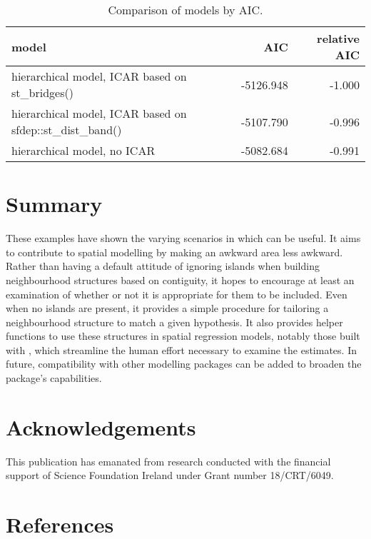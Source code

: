 \begin{table}

\caption{\label{tab:aic-latex}Comparison of models by AIC.}
\centering
\fontsize{8}{10}\selectfont
\begin{tabular}[t]{l|r|r}
\hline
\textbf{model} & \textbf{AIC} & \textbf{relative AIC}\\
\hline
hierarchical model, ICAR based on st\_bridges() & -5126.948 & -1.000\\
\hline
hierarchical model, ICAR based on sfdep::st\_dist\_band() & -5107.790 & -0.996\\
\hline
hierarchical model, no ICAR & -5082.684 & -0.991\\
\hline
\end{tabular}
\end{table}

\hypertarget{summary}{%
\section{Summary}\label{summary}}

These examples have shown the varying scenarios in which  can be useful. It aims to contribute to spatial modelling by making an awkward area less awkward. Rather than having a default attitude of ignoring islands when building neighbourhood structures based on contiguity, it hopes to encourage at least an examination of whether or not it is appropriate for them to be included. Even when no islands are present, it provides a simple procedure for tailoring a neighbourhood structure to match a given hypothesis. It also provides helper functions to use these structures in spatial regression models, notably those built with , which streamline the human effort necessary to examine the estimates. In future, compatibility with other modelling packages can be added to broaden the package's capabilities.

\hypertarget{acknowledgements}{%
\section{Acknowledgements}\label{acknowledgements}}

This publication has emanated from research conducted with the financial support of Science Foundation Ireland under Grant number 18/CRT/6049.

\hypertarget{references}{%
\section*{References}\label{references}}

